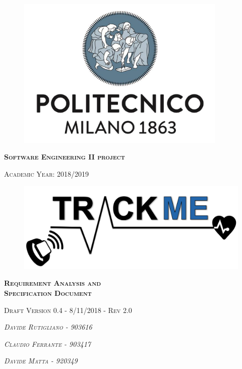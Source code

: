 \thispagestyle{empty}
\begin{figure}[!h]
	\centering
	\includegraphics[width=100mm]{Images/poli-logo.png}
\end{figure}
\hfill
\begin{center}
    \fontsize{18px}{6mm}\selectfont \textsc{\textbf{Software Engineering II project}}
\end{center}
\begin{center}
    \fontsize{12px}{4mm}\selectfont \textsc{Academic Year: 2018/2019}
\end{center}
\hfill
\hfill
\begin{figure}[!h]
	\centering
	\includegraphics[width=120mm]{Images/trackme-logo.png}
\end{figure}
\hfill
\hfill
\begin{center}
    \fontsize{22px}{8mm}\selectfont \textsc{\textbf{Requirement Analysis and\\ Specification Document}}
\end{center}
\begin{center}
    \fontsize{14px}{4mm}\selectfont \textsc{{Draft Version 0.4 - 8/11/2018 - Rev 2.0}}
\end{center}
\hfill
\hfill
\begin{center}
\fontsize{14px}{4mm}\selectfont \textsc{\textit{Davide Rutigliano -  903616}}
\end{center}

\begin{center}
\fontsize{14px}{4mm}\selectfont \textsc{\textit{Claudio Ferrante - 903417\\}}
\end{center}

\begin{center}
\fontsize{14px}{4mm}\selectfont \textsc{\textit{Davide Matta - 920349}}
\end{center}